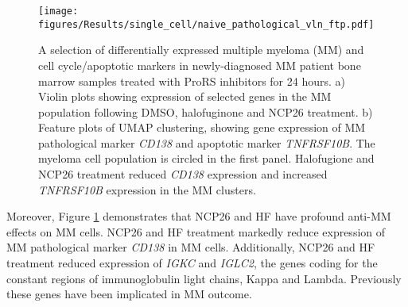 %
\begin{figure}[htb]
\centering
\texttt{[image: figures/Results/single\_cell/naive\_pathological\_vln\_ftp.pdf]}
\caption[Differentially expressed MM markers- newly diagnosed MM]{A selection of differentially expressed multiple myeloma (MM) and cell cycle/apoptotic markers in newly-diagnosed MM patient bone marrow samples treated with ProRS inhibitors for 24 hours.
    a) Violin plots showing expression of selected genes in the MM population following DMSO, halofuginone and NCP26 treatment.
    b) Feature plots of UMAP clustering, showing gene expression of MM pathological marker \textit{CD138} and apoptotic marker \textit{TNFRSF10B}.
The myeloma cell population is circled in the first panel.
Halofugione and NCP26 treatment reduced \textit{CD138} expression and increased \textit{TNFRSF10B} expression in the MM clusters.}
\label{fig:naive_path_vln_ftp}
\end{figure}

Moreover, Figure \ref{fig:naive_path_vln_ftp} demonstrates that NCP26 and HF have profound anti-MM effects on MM cells.
NCP26 and HF treatment markedly reduce expression of MM pathological marker \textit{CD138} in MM cells.
Additionally, NCP26 and HF treatment reduced expression of \textit{IGKC} and \textit{IGLC2}, the genes coding for the constant regions of immunoglobulin light chains, Kappa and Lambda.
Previously these genes have been implicated in MM outcome.


\clearpage

